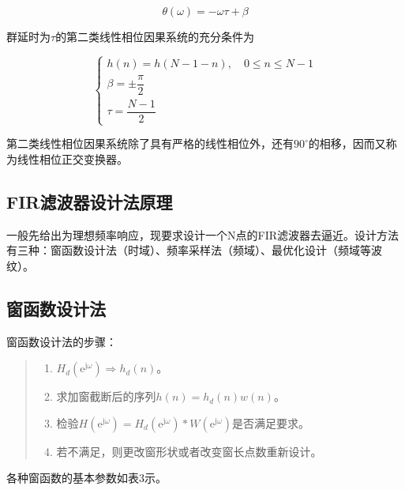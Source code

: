 \documentclass[cn, hazy, blue, normal, 12pt]{elegantnote}
\begin{document}
\begin{equation}
    \theta(\omega)=-\omega\tau+\beta
\end{equation}

群延时为$\tau$的第二类线性相位因果系统的充分条件为

\begin{equation}
    \left\{
    \begin{array}{l}
        h(n)=h(N-1-n), \quad 0\leq n\leq N-1 \\
        \beta=\pm\dfrac{\pi}{2} \\
        \tau=\dfrac{N-1}{2}
    \end{array}
    \right.
\end{equation}

第二类线性相位因果系统除了具有严格的线性相位外，还有$90^{\circ}$的相移，因而又称为线性相位正交变换器。

\subsection{FIR滤波器设计法原理}

一般先给出为理想频率响应，现要求设计一个N点的FIR滤波器去逼近。设计方法有三种：窗函数设计法（时域）、频率采样法（频域）、最优化设计（频域等波纹）。

\subsection{窗函数设计法}

窗函数设计法的步骤：

\begin{quote}
\begin{enumerate}
    \item $H_d(\text{e}^{\text{j}\omega})\Rightarrow h_d(n)$。
    \item 求加窗截断后的序列$h(n)=h_d(n)w(n)$。
    \item 检验$H(\text{e}^{\text{j}\omega})=H_d(\text{e}^{\text{j}\omega})\ast W(\text{e}^{\text{j}\omega})$是否满足要求。
    \item 若不满足，则更改窗形状或者改变窗长点数重新设计。
\end{enumerate}
\end{quote}

各种窗函数的基本参数如表3示。
\end{document}
